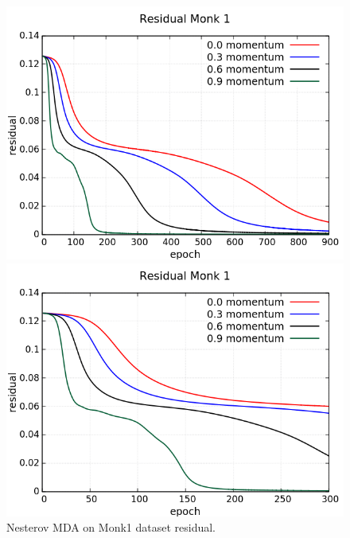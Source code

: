 \begin{figure}[H]
	\centering
	\begin{minipage}[t]{0.5\linewidth}
		\includegraphics[width=\linewidth]{data/MGD/Monk1/NM/Monk1_NMGD_Residual_standard.png}
	\end{minipage}%
	\begin{minipage}[t]{0.5\linewidth}
		\includegraphics[width=\linewidth]{data/MGD/Monk1/NM/Monk1_NMGD_Residual_zoom.png}
	\end{minipage}
	\caption{Nesterov MDA on Monk1 dataset residual.}
\end{figure}

